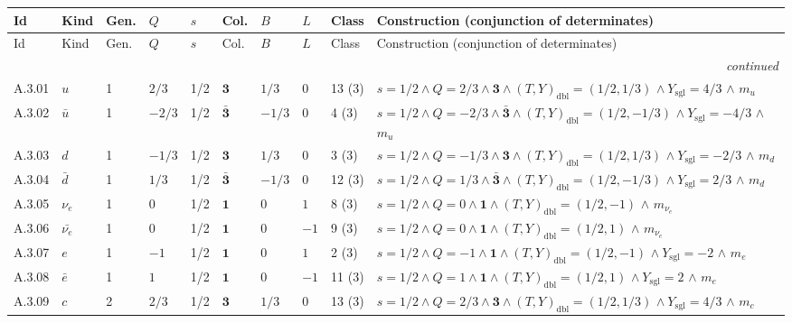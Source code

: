 {\scriptsize\setlength{\tabcolsep}{3pt}
\begin{longtable}{@{}lllllllll>{\raggedright\arraybackslash}p{7.4cm}@{}}
\toprule
Id & Kind & Gen. & $Q$ & $s$ & Col. & $B$ & $L$ & Class & Construction (conjunction of determinates) \\
\midrule\endfirsthead
\toprule
Id & Kind & Gen. & $Q$ & $s$ & Col. & $B$ & $L$ & Class & Construction (conjunction of determinates) \\
\midrule\endhead
\midrule\multicolumn{10}{r}{\emph{continued}}\\\endfoot
\bottomrule\endlastfoot
A.3.01 & $u$ & 1 & $2/3$ & 1/2 & $\mathbf{3}$ & $1/3$ & $0$ & 13 (3) & $s{=}1/2 \wedge Q{=}2/3 \wedge \mathbf{3} \wedge (T,Y)_{\mathrm{dbl}}{=}(1/2,1/3)$ $\wedge\ Y_{\mathrm{sgl}}{=}4/3$ $\wedge$ $m_{u}$ \\
A.3.02 & $\bar{u}$ & 1 & $-2/3$ & 1/2 & $\bar{\mathbf{3}}$ & $-1/3$ & $0$ & 4 (3) & $s{=}1/2 \wedge Q{=}-2/3 \wedge \bar{\mathbf{3}} \wedge (T,Y)_{\mathrm{dbl}}{=}(1/2,-1/3)$ $\wedge\ Y_{\mathrm{sgl}}{=}-4/3$ $\wedge$ $m_{u}$ \\
A.3.03 & $d$ & 1 & $-1/3$ & 1/2 & $\mathbf{3}$ & $1/3$ & $0$ & 3 (3) & $s{=}1/2 \wedge Q{=}-1/3 \wedge \mathbf{3} \wedge (T,Y)_{\mathrm{dbl}}{=}(1/2,1/3)$ $\wedge\ Y_{\mathrm{sgl}}{=}-2/3$ $\wedge$ $m_{d}$ \\
A.3.04 & $\bar{d}$ & 1 & $1/3$ & 1/2 & $\bar{\mathbf{3}}$ & $-1/3$ & $0$ & 12 (3) & $s{=}1/2 \wedge Q{=}1/3 \wedge \bar{\mathbf{3}} \wedge (T,Y)_{\mathrm{dbl}}{=}(1/2,-1/3)$ $\wedge\ Y_{\mathrm{sgl}}{=}2/3$ $\wedge$ $m_{d}$ \\
A.3.05 & $\nu_e$ & 1 & $0$ & 1/2 & $\mathbf{1}$ & $0$ & $1$ & 8 (3) & $s{=}1/2 \wedge Q{=}0 \wedge \mathbf{1} \wedge (T,Y)_{\mathrm{dbl}}{=}(1/2,-1)$ $\wedge$ $m_{\nu_e}$ \\
A.3.06 & $\bar{\nu_e}$ & 1 & $0$ & 1/2 & $\mathbf{1}$ & $0$ & $-1$ & 9 (3) & $s{=}1/2 \wedge Q{=}0 \wedge \mathbf{1} \wedge (T,Y)_{\mathrm{dbl}}{=}(1/2,1)$ $\wedge$ $m_{\nu_e}$ \\
A.3.07 & $e$ & 1 & $-1$ & 1/2 & $\mathbf{1}$ & $0$ & $1$ & 2 (3) & $s{=}1/2 \wedge Q{=}-1 \wedge \mathbf{1} \wedge (T,Y)_{\mathrm{dbl}}{=}(1/2,-1)$ $\wedge\ Y_{\mathrm{sgl}}{=}-2$ $\wedge$ $m_{e}$ \\
A.3.08 & $\bar{e}$ & 1 & $1$ & 1/2 & $\mathbf{1}$ & $0$ & $-1$ & 11 (3) & $s{=}1/2 \wedge Q{=}1 \wedge \mathbf{1} \wedge (T,Y)_{\mathrm{dbl}}{=}(1/2,1)$ $\wedge\ Y_{\mathrm{sgl}}{=}2$ $\wedge$ $m_{e}$ \\
A.3.09 & $c$ & 2 & $2/3$ & 1/2 & $\mathbf{3}$ & $1/3$ & $0$ & 13 (3) & $s{=}1/2 \wedge Q{=}2/3 \wedge \mathbf{3} \wedge (T,Y)_{\mathrm{dbl}}{=}(1/2,1/3)$ $\wedge\ Y_{\mathrm{sgl}}{=}4/3$ $\wedge$ $m_{c}$ \\

\end{longtable}}
